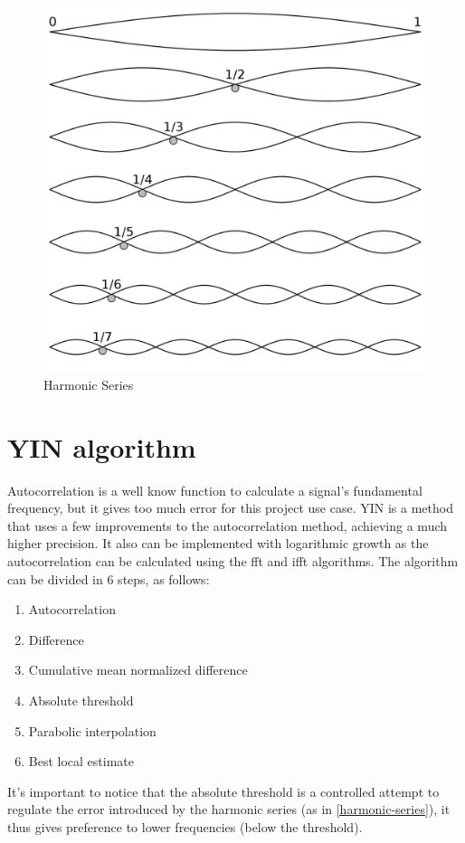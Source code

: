 \begin{figure}[htb]
	\caption{Harmonic Series}
  \label{harmonic-series}
	\begin{center}
    \includegraphics[scale=0.15]{images/harmonic-series.png}
	\end{center}
\end{figure}

\section{YIN algorithm}
Autocorrelation is a well know function to calculate a signal's fundamental
frequency, but it gives too much error for this project use case. YIN \cite{YINArticle}
is a method that uses a few improvements to the autocorrelation method, achieving
a much higher precision. It also can be implemented with logarithmic growth as the
autocorrelation can be calculated using the fft and ifft algorithms. The algorithm
can be divided in 6 steps, as follows:
\begin{enumerate}
  \item Autocorrelation
  \item Difference
  \item Cumulative mean normalized difference
  \item Absolute threshold
  \item Parabolic interpolation
  \item Best local estimate
\end{enumerate}
It's important to notice that the absolute threshold is a controlled attempt to regulate
the error introduced by the harmonic series (as in \autoref{harmonic-series}),
it thus gives preference to lower frequencies (below the threshold).

